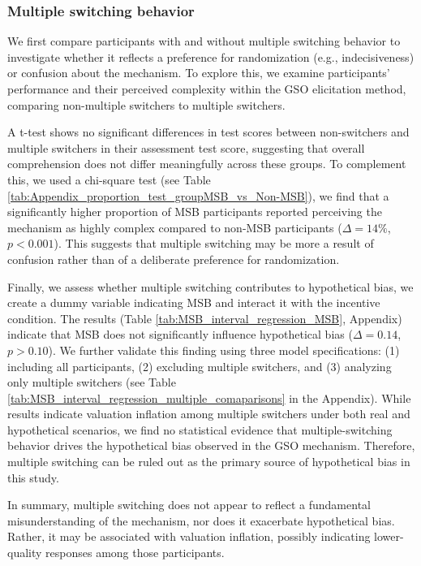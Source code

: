 \documentclass[12pt]{article}
\begin{document}
\subsubsection{Multiple switching behavior}
We first compare participants with and without multiple switching behavior to investigate whether it reflects a preference for randomization (e.g., indecisiveness) or confusion about the mechanism. To explore this, we examine participants' performance and their perceived complexity within the GSO elicitation method, comparing non-multiple switchers to multiple switchers.

A t-test shows no significant differences in test scores between non-switchers and multiple switchers in their assessment test score, suggesting that overall comprehension does not differ meaningfully across these groups. To complement this, we used a chi-square test (see Table \ref{tab:Appendix_proportion_test_groupMSB_vs_Non-MSB}), we find that a significantly higher proportion of MSB participants reported perceiving the mechanism as highly complex compared to non-MSB participants (\(\Delta = 14\%\), \(p < 0.001\)). This suggests that multiple switching may be more a result of confusion rather than of a deliberate preference for randomization.


Finally, we assess whether multiple switching contributes to hypothetical bias, we create a dummy variable indicating MSB  and interact it with the incentive condition. The results (Table \ref{tab:MSB_interval_regression_MSB}, Appendix) indicate that MSB does not significantly influence hypothetical bias (\(\Delta = 0.14\), \(p > 0.10\)). We further validate this finding using three model specifications: (1) including all participants, (2) excluding multiple switchers, and (3) analyzing only multiple switchers (see Table \ref{tab:MSB_interval_regression_multiple_comaparisons} in the Appendix). While results indicate valuation inflation among multiple switchers under both real and hypothetical scenarios, we find no statistical evidence that multiple-switching behavior drives the hypothetical bias observed in the GSO mechanism. Therefore, multiple switching can be ruled out as the primary source of hypothetical bias in this study.

In summary, multiple switching does not appear to reflect a fundamental misunderstanding of the mechanism, nor does it exacerbate hypothetical bias. Rather, it may be associated with valuation inflation, possibly indicating lower-quality responses among those participants.
\end{document}
